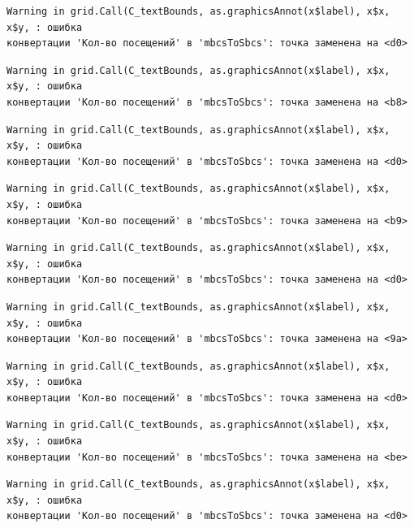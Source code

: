 \documentclass[
  letterpaper,
  DIV=11,
  numbers=noendperiod]{scrreprt}
\begin{document}
\begin{verbatim}
Warning in grid.Call(C_textBounds, as.graphicsAnnot(x$label), x$x, x$y, : ошибка
конвертации 'Кол-во посещений' в 'mbcsToSbcs': точка заменена на <d0>
\end{verbatim}

\begin{verbatim}
Warning in grid.Call(C_textBounds, as.graphicsAnnot(x$label), x$x, x$y, : ошибка
конвертации 'Кол-во посещений' в 'mbcsToSbcs': точка заменена на <b8>
\end{verbatim}

\begin{verbatim}
Warning in grid.Call(C_textBounds, as.graphicsAnnot(x$label), x$x, x$y, : ошибка
конвертации 'Кол-во посещений' в 'mbcsToSbcs': точка заменена на <d0>
\end{verbatim}

\begin{verbatim}
Warning in grid.Call(C_textBounds, as.graphicsAnnot(x$label), x$x, x$y, : ошибка
конвертации 'Кол-во посещений' в 'mbcsToSbcs': точка заменена на <b9>
\end{verbatim}

\begin{verbatim}
Warning in grid.Call(C_textBounds, as.graphicsAnnot(x$label), x$x, x$y, : ошибка
конвертации 'Кол-во посещений' в 'mbcsToSbcs': точка заменена на <d0>
\end{verbatim}

\begin{verbatim}
Warning in grid.Call(C_textBounds, as.graphicsAnnot(x$label), x$x, x$y, : ошибка
конвертации 'Кол-во посещений' в 'mbcsToSbcs': точка заменена на <9a>
\end{verbatim}

\begin{verbatim}
Warning in grid.Call(C_textBounds, as.graphicsAnnot(x$label), x$x, x$y, : ошибка
конвертации 'Кол-во посещений' в 'mbcsToSbcs': точка заменена на <d0>
\end{verbatim}

\begin{verbatim}
Warning in grid.Call(C_textBounds, as.graphicsAnnot(x$label), x$x, x$y, : ошибка
конвертации 'Кол-во посещений' в 'mbcsToSbcs': точка заменена на <be>
\end{verbatim}

\begin{verbatim}
Warning in grid.Call(C_textBounds, as.graphicsAnnot(x$label), x$x, x$y, : ошибка
конвертации 'Кол-во посещений' в 'mbcsToSbcs': точка заменена на <d0>
\end{verbatim}
\end{document}
